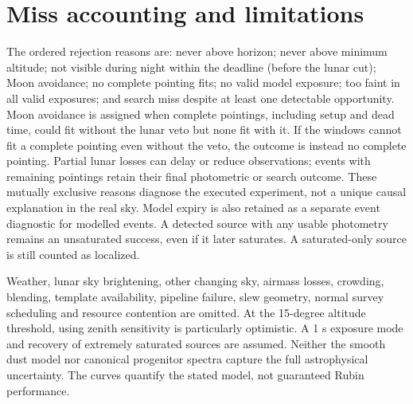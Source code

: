 \documentclass[11pt]{article}
\begin{document}
\section{Miss accounting and limitations}
The ordered rejection reasons are: never above horizon; never above minimum
altitude; not visible during night within the deadline (before the lunar cut);
Moon avoidance; no complete pointing fits; no valid model exposure; too faint
in all valid exposures; and search miss despite at least one detectable
opportunity. Moon avoidance is assigned when complete pointings, including
setup and dead time, could fit without the lunar veto but none fit with it.
If the windows cannot fit a complete pointing even without the veto, the
outcome is instead no complete pointing. Partial lunar losses can delay or
reduce observations; events with remaining pointings retain their final
photometric or search outcome. These mutually exclusive reasons diagnose
the executed experiment, not a unique causal explanation in the real sky.
Model expiry is also retained as a separate event diagnostic for modelled events.
A detected source with any usable photometry remains an unsaturated success,
even if it later saturates. A saturated-only source is still counted as localized.

Weather, lunar sky brightening, other changing sky, airmass losses, crowding,
blending, template availability, pipeline failure, slew geometry, normal survey scheduling and
resource contention are omitted. At the 15-degree altitude threshold, using
zenith sensitivity is particularly optimistic. A 1 s exposure mode and recovery
of extremely saturated sources are assumed. Neither the smooth dust model nor
canonical progenitor spectra capture the full astrophysical uncertainty.
The curves quantify the stated model, not guaranteed Rubin performance.
\end{document}
